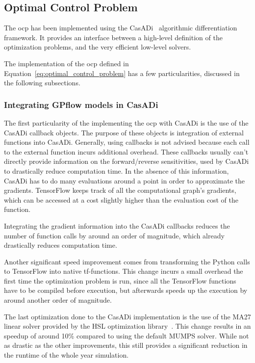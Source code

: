 \subsection{Optimal Control Problem}

The \acrlong{ocp} has been implemented using the
CasADi~\cite{anderssonCasADiSoftwareFramework2019} algorithmic differentiation
framework. It provides an interface between a high-level definition of the
optimization problems, and the very efficient low-level solvers. 

The implementation of the \acrshort{ocp} defined in
Equation~\ref{eq:optimal_control_problem} has a few particularities, discussed
in the following subsections.

\subsubsection{Integrating GPflow models in CasADi}

The first particularity of the implementing the \acrshort{ocp} with CasADi is
the use of the CasADi callback objects. The purpose of these objects is
integration of external functions into CasADi. Generally, using callbacks is not
advised because each call to the external function incurs additional overhead.
These callbacks usually can't directly provide information on the
forward/reverse sensitivities, used by CasADi to drastically reduce computation
time. In the absence of this information, CasADi has to do many evaluations
around a point in order to approximate the gradients. TensorFlow keeps track of
all the computational graph's gradients, which can be accessed at a cost
slightly higher than the evaluation cost of the function.

Integrating the gradient information into the CasADi callbacks reduces the
number of function calls by around an order of magnitude, which already
drastically reduces computation time.

Another significant speed improvement comes from transforming the Python calls
to TensorFlow into native tf-functions. This change incurs a small overhead the
first time the optimization problem is run, since all the TensorFlow functions
have to be compiled before execution, but afterwards speeds up the execution by
around another order of magnitude.

The last optimization done to the CasADi implementation is the use of the MA27
linear solver provided by the HSL optimization
library~\cite{HSLCollectionFortran}. This change results in an speedup of around
10\% compared to using the default MUMPS solver. While not as drastic as the
other improvements, this still provides a significant reduction in the runtime
of the whole year simulation.

